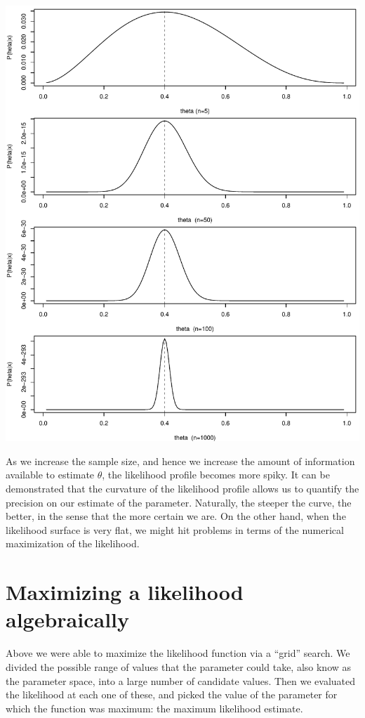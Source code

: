 \documentclass[
]{book}
\begin{document}
\includegraphics{ECOMODbook_files/figure-latex/ch13.4-1.pdf}

As we increase the sample size, and hence we increase the amount of information available to estimate \(\theta\), the likelihood profile becomes more spiky. It can be demonstrated that the curvature of the likelihood profile allows us to quantify the precision on our estimate of the parameter. Naturally, the steeper the curve, the better, in the sense that the more certain we are. On the other hand, when the likelihood surface is very flat, we might hit problems in terms of the numerical maximization of the likelihood.

\hypertarget{maximizing-a-likelihood-algebraically}{%
\section{Maximizing a likelihood algebraically}\label{maximizing-a-likelihood-algebraically}}

Above we were able to maximize the likelihood function via a ``grid'' search. We divided the possible range of values that the parameter could take, also know as the parameter space, into a large number of candidate values. Then we evaluated the likelihood at each one of these, and picked the value of the parameter for which the function was maximum: the maximum likelihood estimate.
\end{document}
